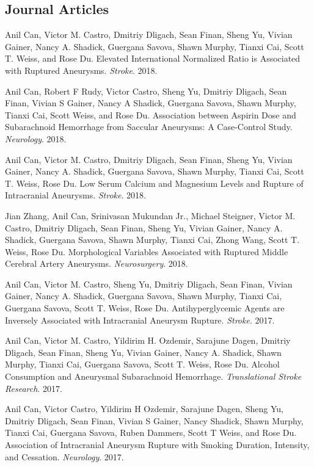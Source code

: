 \documentclass[letterpaper]{article}
\renewenvironment{itemize}{
  \begin{list}{}{
    \setlength{\leftmargin}{1.5em}
  }
}{
  \end{list}
}
\begin{document}
\subsection*{Journal Articles}

\begin{itemize}
\item Anil Can, Victor M. Castro, Dmitriy Dligach, Sean Finan, Sheng Yu, Vivian Gainer, Nancy A. Shadick, Guergana Savova, Shawn Murphy, Tianxi Cai, Scott T. Weiss, and Rose Du. Elevated International Normalized Ratio is Associated with Ruptured Aneurysms. \emph{Stroke}. 2018.
\item Anil Can, Robert F Rudy, Victor Castro, Sheng Yu, Dmitriy Dligach, Sean Finan, Vivian S Gainer, Nancy A Shadick, Guergana Savova, Shawn Murphy, Tianxi Cai, Scott Weiss, and Rose Du. Association between Aspirin Dose and Subarachnoid Hemorrhage from Saccular Aneurysms: A Case-Control Study. \emph{Neurology}. 2018.
\item Anil Can, Victor M. Castro, Dmitriy Dligach, Sean Finan, Sheng Yu, Vivian Gainer, Nancy A. Shadick, Guergana Savova, Shawn Murphy, Tianxi Cai, Scott T. Weiss, Rose Du. Low Serum Calcium and Magnesium Levels and Rupture of Intracranial Aneurysms. \emph{Stroke}. 2018.
\item Jian Zhang, Anil Can, Srinivasan Mukundan Jr., Michael Steigner, Victor M. Castro, Dmitriy Dligach, Sean Finan, Sheng Yu, Vivian Gainer, Nancy A. Shadick, Guergana Savova, Shawn Murphy, Tianxi Cai, Zhong Wang, Scott T. Weiss, Rose Du. Morphological Variables Associated with Ruptured Middle Cerebral Artery Aneurysms. \emph{Neurosurgery}. 2018.
\item Anil Can, Victor M. Castro, Sheng Yu, Dmitriy Dligach, Sean Finan, Vivian Gainer, Nancy A. Shadick, Guergana Savova, Shawn Murphy, Tianxi Cai, Guergana Savova, Scott T. Weiss, Rose Du. Antihyperglycemic Agents are Inversely Associated with Intracranial Aneurysm Rupture. \emph{Stroke}. 2017.
\item Anil Can, Victor M. Castro, Yildirim H. Ozdemir, Sarajune Dagen, Dmitriy Dligach, Sean Finan, Sheng Yu, Vivian Gainer, Nancy A. Shadick, Shawn Murphy, Tianxi Cai, Guergana Savova, Scott T. Weiss, Rose Du. Alcohol Consumption and Aneurysmal Subarachnoid Hemorrhage. \emph{Translational Stroke Research}. 2017.
\item Anil Can, Victor Castro, Yildirim H Ozdemir, Sarajune Dagen, Sheng Yu, Dmitriy Dligach, Sean Finan, Vivian S Gainer, Nancy Shadick, Shawn Murphy, Tianxi Cai, Guergana Savova, Ruben Dammers, Scott T Weiss, and Rose Du. Association of Intracranial Aneurysm Rupture with Smoking Duration, Intensity, and Cessation. \emph{Neurology}. 2017.

\end{itemize}
\end{document}
